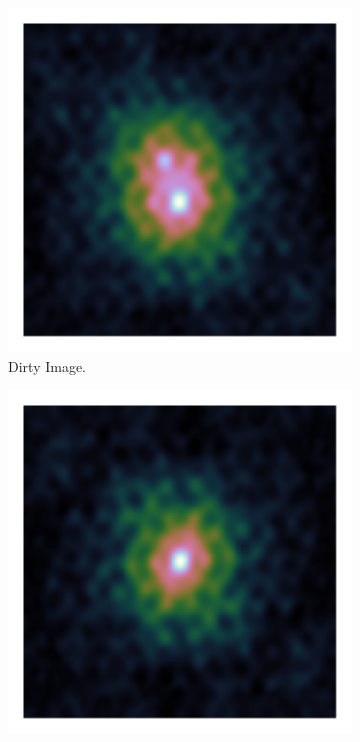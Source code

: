 \begin{figure}[h]
	\centering
	\begin{subfigure}[b]{0.3\linewidth}
		\includegraphics[width=\linewidth, clip, trim= 0.25in 0.25in 0.25in 0.25in]{./chapters/03.cd/simulated/dirty.png}
		\caption{Dirty Image.}
		\label{cd:efficient:gradients:dirty}
	\end{subfigure}
	\begin{subfigure}[b]{0.3\linewidth}
		\includegraphics[width=\linewidth, clip, trim= 0.25in 0.25in 0.25in 0.25in]{./chapters/03.cd/simulated/psf.png}

\end{subfigure}
\end{figure}
